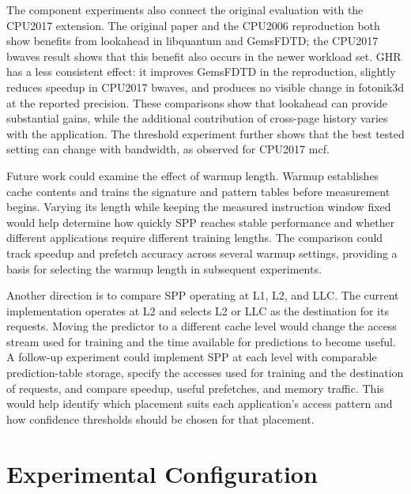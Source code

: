 \documentclass[a4paper,11pt]{article}
\begin{document}
The component experiments also connect the original evaluation with the CPU2017 extension. The original paper and the CPU2006 reproduction both show benefits from lookahead in libquantum and GemsFDTD; the CPU2017 bwaves result shows that this benefit also occurs in the newer workload set. GHR has a less consistent effect: it improves GemsFDTD in the reproduction, slightly reduces speedup in CPU2017 bwaves, and produces no visible change in fotonik3d at the reported precision. These comparisons show that lookahead can provide substantial gains, while the additional contribution of cross-page history varies with the application. The threshold experiment further shows that the best tested setting can change with bandwidth, as observed for CPU2017 mcf.

Future work could examine the effect of warmup length. Warmup establishes cache contents and trains the signature and pattern tables before measurement begins. Varying its length while keeping the measured instruction window fixed would help determine how quickly SPP reaches stable performance and whether different applications require different training lengths. The comparison could track speedup and prefetch accuracy across several warmup settings, providing a basis for selecting the warmup length in subsequent experiments.

Another direction is to compare SPP operating at L1, L2, and LLC. The current implementation operates at L2 and selects L2 or LLC as the destination for its requests. Moving the predictor to a different cache level would change the access stream used for training and the time available for predictions to become useful. A follow-up experiment could implement SPP at each level with comparable prediction-table storage, specify the accesses used for training and the destination of requests, and compare speedup, useful prefetches, and memory traffic. This would help identify which placement suits each application's access pattern and how confidence thresholds should be chosen for that placement.

\appendix
\section{Experimental Configuration}\label{app:configuration}
\end{document}
